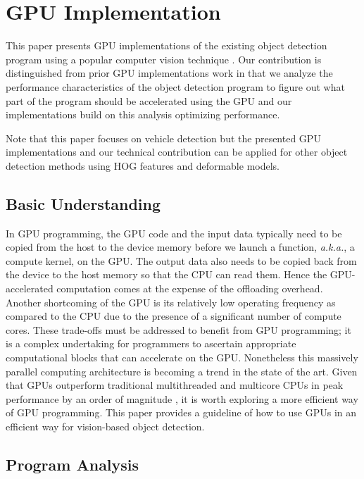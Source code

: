 \section{GPU Implementation}
\label{sec:implementation}

This paper presents GPU implementations of the existing object
detection program using a popular computer vision technique
\cite{Niknejad12}.
Our contribution is distinguished from prior GPU implementations work
\cite{Chen11, Prisacariu09} in that we analyze the performance
characteristics of the object detection program to figure out what part
of the program should be accelerated using the GPU and our
implementations build on this analysis optimizing performance.

Note that this paper focuses on vehicle detection but the presented GPU
implementations and our technical contribution can be applied for other
object detection methods using HOG features and deformable models.

\subsection{Basic Understanding}
\label{sec:understanding}

In GPU programming, the GPU code and the input data typically need to be
copied from the host to the device memory before we launch a function,
\textit{a.k.a.}, a compute kernel, on the GPU.
The output data also needs to be copied back from the device to the host
memory so that the CPU can read them.
Hence the GPU-accelerated computation comes at the expense of the
offloading overhead.
Another shortcoming of the GPU is its relatively low operating frequency
as compared to the CPU due to the presence of a significant number of
compute cores.
These trade-offs must be addressed to benefit from GPU programming; it
is a complex undertaking for programmers to ascertain appropriate
computational blocks that can accelerate on the GPU.
Nonetheless this massively parallel computing architecture is becoming a
trend in the state of the art.
Given that GPUs outperform traditional multithreaded and multicore CPUs
in peak performance by an order of magnitude \cite{Kato13_2}, it is
worth exploring a more efficient way of GPU programming.
This paper provides a guideline of how to use GPUs in an efficient way
for vision-based object detection.

\subsection{Program Analysis}
\label{sec:analysis}

